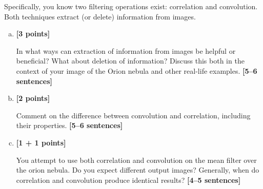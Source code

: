 \documentclass[11pt]{article}
\begin{document}
Specifically, you know two filtering operations exist: correlation and convolution. Both techniques extract (or delete) information from images.

\begin{enumerate}[(a)]

    \item \textbf{[3 points]} 
    \begin{tcolorbox}[colback=orange!5!white,colframe=orange!75!black]
    In what ways can extraction of information from images be helpful or beneficial? What about deletion of information? Discuss this both in the context of your image of the Orion nebula and other real-life examples. \textbf{[5--6 sentences]}
    \end{tcolorbox}
    

    \item \textbf{[2 points]} 
    \begin{tcolorbox}[colback=orange!5!white,colframe=orange!75!black]
    Comment on the difference between convolution and correlation, including their properties. \textbf{[5--6 sentences]}
    \end{tcolorbox}
    

    \pagebreak
    \item \textbf{[1 + 1 points]} 
    \begin{tcolorbox}[colback=orange!5!white,colframe=orange!75!black]
    You attempt to use both correlation and convolution on the mean filter over the orion nebula. Do you expect different output images? Generally, when do correlation and convolution produce identical results? \textbf{[4--5 sentences]}
    \end{tcolorbox}
    

\end{enumerate}
\end{document}
